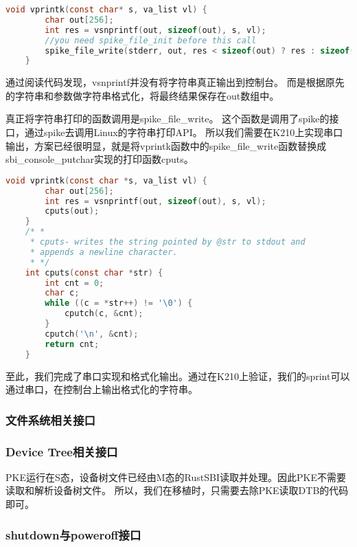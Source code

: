 \begin{lstlisting}[language=C, caption={vprintk实现代码}, label={lst:vprintk} ]
    void vprintk(const char* s, va_list vl) {
        char out[256];
        int res = vsnprintf(out, sizeof(out), s, vl);
        //you need spike_file_init before this call
        spike_file_write(stderr, out, res < sizeof(out) ? res : sizeof(out));
    }
\end{lstlisting}

通过阅读代码发现，vsnprintf并没有将字符串真正输出到控制台。
而是根据原先的字符串和参数做字符串格式化，将最终结果保存在out数组中。

真正将字符串打印的函数调用是spike\_file\_write。
这个函数是调用了spike的接口，通过spike去调用Linux的字符串打印API。
所以我们需要在K210上实现串口输出，方案已经很明显，就是将vprintk函数中的spike\_file\_write函数替换成sbi\_console\_putchar实现的打印函数cputs。

\begin{lstlisting}[language=C, caption={vprintk改造代码}, label={lst:vprintk_dev} ]
    void vprintk(const char *s, va_list vl) {
        char out[256];
        int res = vsnprintf(out, sizeof(out), s, vl);
        cputs(out);
    }
    /* *
     * cputs- writes the string pointed by @str to stdout and
     * appends a newline character.
     * */
    int cputs(const char *str) {
        int cnt = 0;
        char c;
        while ((c = *str++) != '\0') {
            cputch(c, &cnt);
        }
        cputch('\n', &cnt);
        return cnt;
    }   
\end{lstlisting}

至此，我们完成了串口实现和格式化输出。通过在K210上验证，我们的sprint可以通过串口，在控制台上输出格式化的字符串。

\subsubsection{文件系统相关接口}

\subsubsection{Device Tree相关接口}

PKE运行在S态，设备树文件已经由M态的RustSBI读取并处理。因此PKE不需要读取和解析设备树文件。
所以，我们在移植时，只需要去除PKE读取DTB的代码即可。

\subsubsection{shutdown与poweroff接口}

